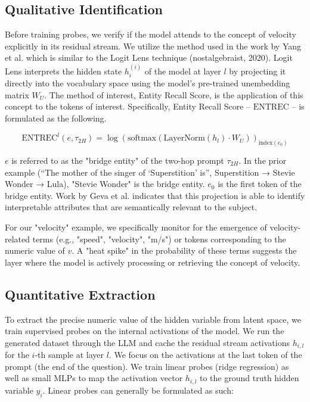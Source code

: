 \documentclass[11pt]{article}
\begin{document}
\subsection{Qualitative Identification}


Before training probes, we verify if the model attends to the concept of velocity explicitly in its residual stream. We utilize the method used in the work by Yang et al. \cite{yang2024large} which is similar to the Logit Lens technique (nostalgebraist, 2020). Logit Lens interprets the hidden state $h_i^{(i)}$ of the model at layer $l$ by projecting it directly into the vocabulary space using the model's pre-trained unembedding matrix $W_U$. The method of interest, Entity Recall Score, is the application of this concept to the tokens of interest. Specifically, Entity Recall Score -- $\text{ENTREC}$ -- is formulated as the following. 

$$\text{ENTREC}^l(e, \tau_{2H}) = \log \left( \text{softmax} \left( \text{LayerNorm} (h_l) \cdot W_U \right) \right)_{\text{index}(e_0)}$$


$e$ is referred to as the "bridge entity" of the two-hop prompt $\tau_{2H}$. In the prior example (“The mother of the singer of ‘Superstition’ is”, Superstition → Stevie Wonder → Lula), "Stevie Wonder" is the bridge entity. $e_0$ is the first token of the bridge entity. Work by Geva et al. \cite{geva2022transformer} indicates that this projection is able to identify interpretable attributes that are semantically relevant to the subject. 

For our "velocity" example, we specifically monitor for the emergence of velocity-related terms (e.g., "speed", "velocity", "m/s") or tokens corresponding to the numeric value of $v$. A "heat spike" in the probability of these terms suggests the layer where the model is actively processing or retrieving the concept of velocity. 

\subsection{Quantitative Extraction}
To extract the precise numeric value of the hidden variable from latent space, we train supervised probes on the internal activations of the model. We run the generated dataset through the LLM and cache the residual stream activations $h_{i,l}$ for the $i$-th sample at layer $l$. We focus on the activations at the last token of the prompt (the end of the question). We train linear probes (ridge regression) as well as small MLPs to map the activation vector $h_{i,l}$ to the ground truth hidden variable $y_i$. Linear probes can generally be formulated as such:
\end{document}
